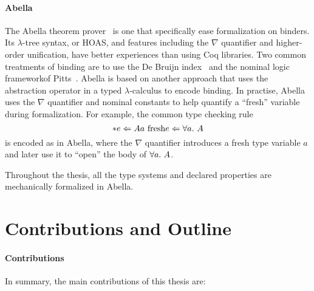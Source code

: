 \paragraph{Abella}
The Abella theorem prover~\citep{AbellaDesc} is one that specifically ease
formalization on binders.
Its $\lambda$-tree syntax, or HOAS, and features including the $\nabla$ quantifier
and higher-order unification, have better experiences than using Coq libraries.
Two common treatments of binding are to use the De Bruijn index~\citep{DEBRUIJN1972381}
and the nominal logic frameworkof Pitts~\citep{PITTS2003165}.
Abella is based on another approach that uses the abstraction operator in a typed
$\lambda$-calculus to encode binding.
In practise, Abella uses the $\nabla$ quantifier and nominal constants to help
quantify a ``fresh'' variable during formalization.
For example, the common type checking rule
$$\inferrule*{e \Lto A \\ a \text{ fresh}}{e \Lto \all A}$$
is encoded as
in Abella, where the $\nabla$ quantifier introduces a fresh type variable $a$
and later use it to ``open'' the body of $\all A$.

Throughout the thesis, all the type systems and declared properties are
mechanically formalized in Abella.



\section{Contributions and Outline}

\paragraph{Contributions}
In summary, the main contributions of this thesis are:


